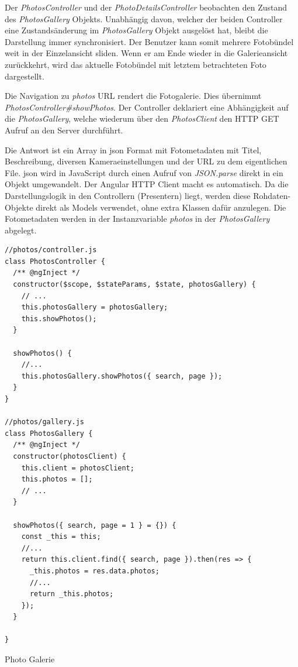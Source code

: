  Der \emph{PhotosController} und der \emph{PhotoDetailsController} beobachten den Zustand des \emph{PhotosGallery} Objekts. Unabhängig davon, welcher der beiden Controller eine Zustandsänderung im \emph{PhotosGallery} Objekt ausgelöst hat, bleibt die Darstellung immer synchronisiert. Der Benutzer kann somit mehrere Fotobündel weit in der Einzelansicht sliden. Wenn er am Ende wieder in die Galerieansicht zurückkehrt, wird das aktuelle Fotobündel mit letztem betrachteten Foto dargestellt.

Die Navigation zu \emph{\/photos} URL rendert die Fotogalerie. Dies übernimmt  \emph{PhotosController\#showPhotos}. Der Controller deklariert eine Abhängigkeit auf die \emph{PhotosGallery}, welche wiederum über den \emph{PhotosClient} den HTTP GET Aufruf an den Server durchführt.

Die Antwort ist ein Array in \gls{json} Format mit Fotometadaten mit Titel, Beschreibung, diversen Kameraeinstellungen und der URL zu dem eigentlichen File. \gls{json} wird in JavaScript durch einen Aufruf von \emph{JSON.parse} direkt in ein Objekt umgewandelt. Der Angular HTTP Client macht es automatisch. Da die Darstellungslogik in den Controllern (Presentern) liegt, werden diese Rohdaten-Objekte direkt als Models verwendet, ohne extra Klassen dafür anzulegen. Die Fotometadaten werden in der Instanzvariable \emph{photos} in der \emph{PhotosGallery} abgelegt.


\begin{listing}[H]
\begin{verbatim}
//photos/controller.js
class PhotosController {
  /** @ngInject */
  constructor($scope, $stateParams, $state, photosGallery) {
    // ...
    this.photosGallery = photosGallery;
    this.showPhotos();
  }

  showPhotos() {
    //...
    this.photosGallery.showPhotos({ search, page });
  }
}

//photos/gallery.js
class PhotosGallery {
  /** @ngInject */
  constructor(photosClient) {
    this.client = photosClient;
    this.photos = [];
    // ...
  }

  showPhotos({ search, page = 1 } = {}) {
    const _this = this;
    //...
    return this.client.find({ search, page }).then(res => {
      _this.photos = res.data.photos;
      //...
      return _this.photos;
    });
  }

}

\end{verbatim}
\caption{Photo Galerie}
\label{lst:photo_gallery}
\end{listing}

